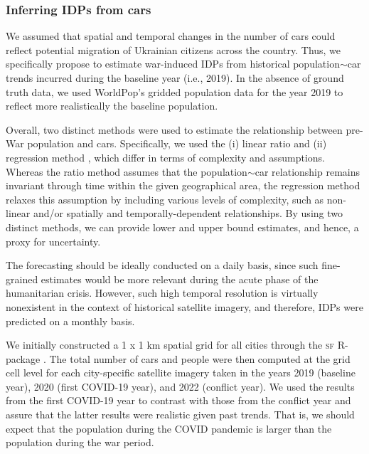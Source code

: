 \documentclass[sn-basic]{sn-jnl}%
\begin{document}
\subsubsection{Inferring IDPs from cars} \label{MMS5-2}
We assumed that spatial and temporal changes in the number of cars could reflect potential migration of Ukrainian citizens across the country.  Thus, we specifically propose to estimate war-induced IDPs from historical population$\sim$car trends incurred during the baseline year (i.e., 2019). In the absence of ground truth data, we used WorldPop's gridded population data for the year 2019 to reflect more realistically the baseline population.

Overall, two distinct methods were used to estimate the relationship between pre-War population and cars. Specifically, we used the (i) linear ratio and (ii) regression method \citep{George_et_al_2004}, which differ in terms of complexity and assumptions. Whereas the ratio method assumes that the population$\sim$car relationship remains invariant through time within the given geographical area, the regression method relaxes this assumption by including various levels of complexity, such as non-linear and/or spatially and temporally-dependent relationships. By using two distinct methods, we can provide lower and upper bound estimates, and hence, a proxy for uncertainty.

The forecasting should be ideally conducted on a daily basis, since such fine-grained estimates would be more relevant during the acute phase of the humanitarian crisis. However, such high temporal resolution is virtually nonexistent in the context of historical satellite imagery, and therefore, IDPs were predicted on a monthly basis. %

We initially constructed a 1 x 1 km spatial grid for all cities through the \textsc{sf} R-package \citep{Pebesma_2018}. The total number of cars and people were then computed at the grid cell level for each city-specific satellite imagery taken in the years 2019 (baseline year), 2020 (first COVID-19 year), and 2022 (conflict year). We used the results from the first COVID-19 year to contrast with those from the conflict year and assure that the latter results were realistic given past trends. That is, we should expect that the population during the COVID pandemic is larger than the population during the war period.
\end{document}
